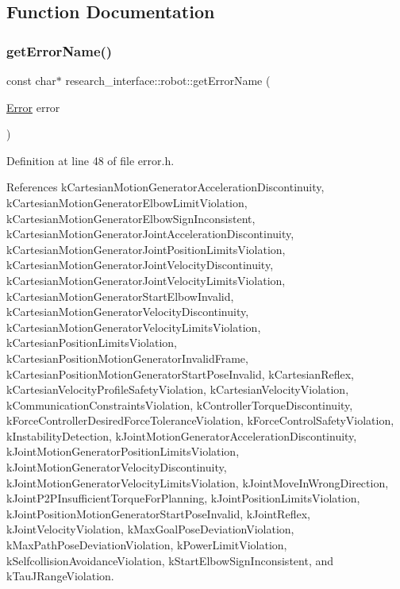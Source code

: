 \subsection{Function Documentation}
\mbox{\label{namespaceresearch__interface_1_1robot_a95920f2181aaff8df4949bc7d9036a2f}} 
\subsubsection{\texorpdfstring{get\+Error\+Name()}{getErrorName()}}
{\footnotesize\ttfamily const char$\ast$ research\+\_\+interface\+::robot\+::get\+Error\+Name (\begin{DoxyParamCaption}\item[{\hyperlink{namespaceresearch__interface_1_1robot_a32c6a50656f8b9130114ad84bdde7589}{Error}}]{error }\end{DoxyParamCaption})}



Definition at line 48 of file error.\+h.



References k\+Cartesian\+Motion\+Generator\+Acceleration\+Discontinuity, k\+Cartesian\+Motion\+Generator\+Elbow\+Limit\+Violation, k\+Cartesian\+Motion\+Generator\+Elbow\+Sign\+Inconsistent, k\+Cartesian\+Motion\+Generator\+Joint\+Acceleration\+Discontinuity, k\+Cartesian\+Motion\+Generator\+Joint\+Position\+Limits\+Violation, k\+Cartesian\+Motion\+Generator\+Joint\+Velocity\+Discontinuity, k\+Cartesian\+Motion\+Generator\+Joint\+Velocity\+Limits\+Violation, k\+Cartesian\+Motion\+Generator\+Start\+Elbow\+Invalid, k\+Cartesian\+Motion\+Generator\+Velocity\+Discontinuity, k\+Cartesian\+Motion\+Generator\+Velocity\+Limits\+Violation, k\+Cartesian\+Position\+Limits\+Violation, k\+Cartesian\+Position\+Motion\+Generator\+Invalid\+Frame, k\+Cartesian\+Position\+Motion\+Generator\+Start\+Pose\+Invalid, k\+Cartesian\+Reflex, k\+Cartesian\+Velocity\+Profile\+Safety\+Violation, k\+Cartesian\+Velocity\+Violation, k\+Communication\+Constraints\+Violation, k\+Controller\+Torque\+Discontinuity, k\+Force\+Controller\+Desired\+Force\+Tolerance\+Violation, k\+Force\+Control\+Safety\+Violation, k\+Instability\+Detection, k\+Joint\+Motion\+Generator\+Acceleration\+Discontinuity, k\+Joint\+Motion\+Generator\+Position\+Limits\+Violation, k\+Joint\+Motion\+Generator\+Velocity\+Discontinuity, k\+Joint\+Motion\+Generator\+Velocity\+Limits\+Violation, k\+Joint\+Move\+In\+Wrong\+Direction, k\+Joint\+P2\+P\+Insufficient\+Torque\+For\+Planning, k\+Joint\+Position\+Limits\+Violation, k\+Joint\+Position\+Motion\+Generator\+Start\+Pose\+Invalid, k\+Joint\+Reflex, k\+Joint\+Velocity\+Violation, k\+Max\+Goal\+Pose\+Deviation\+Violation, k\+Max\+Path\+Pose\+Deviation\+Violation, k\+Power\+Limit\+Violation, k\+Selfcollision\+Avoidance\+Violation, k\+Start\+Elbow\+Sign\+Inconsistent, and k\+Tau\+J\+Range\+Violation.



